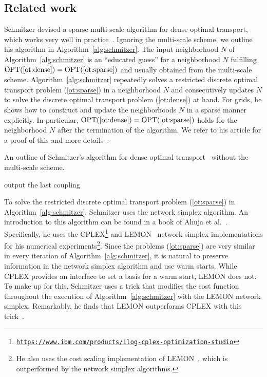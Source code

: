 \documentclass[a4paper,UKenglish,cleveref, autoref, thm-restate]{lipics-v2021}
\DeclareMathOperator{\OPT}{OPT}
\begin{document}
\subsection{Related work}
Schmitzer devised a sparse multi-scale algorithm for dense optimal transport, which works very well in practice~\cite{schmitzer2016sparse,schrieber2017dotmark}.
Ignoring the multi-scale scheme, we outline his algorithm in Algorithm~\ref{alg:schmitzer}.
The input neighborhood $N$ of Algorithm~\ref{alg:schmitzer} is an ``educated guess'' for a neighborhood $N$ fulfilling $\OPT(\text{\ref{ot:dense}}) = \OPT(\text{\ref{ot:sparse}})$ and usually obtained from the multi-scale scheme.
Algorithm~\ref{alg:schmitzer} repeatedly solves a restricted discrete optimal transport problem (\ref{ot:sparse}) in a neighborhood $N$ and consecutively updates $N$ to solve the discrete optimal transport problem (\ref{ot:dense}) at hand.
For grids, he shows how to construct and update the neighborhoods $N$ in a sparse manner explicitly.
In particular, $\OPT(\text{\ref{ot:dense}}) = \OPT(\text{\ref{ot:sparse}})$ holds for the neighborhood $N$ after the termination of the algorithm.
We refer to his article for a proof of this and more details~\cite{schmitzer2016sparse}.
\begin{algorithm}[h]
\caption{An outline of Schmitzer's algorithm for dense optimal transport~\cite{schmitzer2016sparse} without the multi-scale scheme.}\label{alg:schmitzer}
\DontPrintSemicolon
{}
output the last coupling\;
\end{algorithm}

To solve the restricted discrete optimal transport problem (\ref{ot:sparse}) in Algorithm~\ref{alg:schmitzer}, Schmitzer uses the network simplex algorithm.
An introduction to this algorithm can be found in a book of Ahuja et al.~\cite{ahuja1993networkflows}.
Specifically, he uses the CPLEX\footnote{\href{https://www.ibm.com/products/ilog-cplex-optimization-studio}{\tt https://www.ibm.com/products/ilog-cplex-optimization-studio}} and LEMON~\cite{dezso2010lemon} network simplex implementations for his numerical experiments\footnote{He also uses the cost scaling implementation of LEMON~\cite{dezso2010lemon}, which is outperformed by the network simplex algorithms.}.
Since the problems (\ref{ot:sparse}) are very similar in every iteration of Algorithm~\ref{alg:schmitzer}, it is natural to preserve information in the network simplex algorithm and use warm starts.
While CPLEX provides an interface to set a basis for a warm start, LEMON does not.
To make up for this, Schmitzer uses a trick that modifies the cost function throughout the execution of Algorithm~\ref{alg:schmitzer} with the LEMON network simplex.
Remarkably, he finds that LEMON outperforms CPLEX with this trick~\cite{schmitzer2016sparse}.
\end{document}
